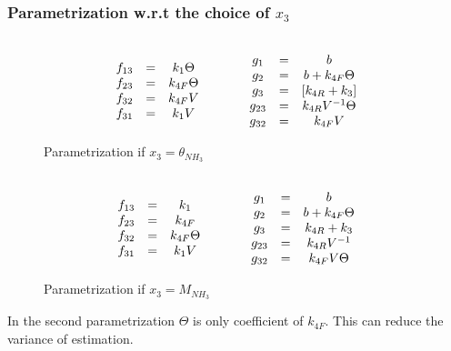 \subsubsection{Parametrization w.r.t the choice of $x_3$}

\begin{figure}[H]
 \begin{align*}
    \begin{matrix} 
    \\f_{13} &=& k_1 \Theta
    \\f_{23} &=& k_{4F} \Theta
    \\f_{32} &=& k_{4F} V
    \\f_{31} &=& k_1 V
     \end{matrix}
    \qquad \qquad
    \begin{matrix} 
    \\ g_1    &=& b
    \\ g_2    &=& b + k_{4F} \Theta
    \\ g_{3}  &=& [k_{4R}+k_3]
    \\ g_{23} &=& k_{4R} V^{-1} \Theta
    \\ g_{32} &=& k_{4F} V
     \end{matrix}
\end{align*}
 \caption*{Parametrization if $x_3 = \theta_{NH_3}$}
\end{figure}
\begin{figure}[H]
\begin{align*}
    \begin{matrix} 
    \\f_{13} &=& k_1
    \\f_{23} &=& k_{4F}
    \\f_{32} &=& k_{4F} \Theta
    \\f_{31} &=& k_1 V
     \end{matrix}
    \qquad \qquad
    \begin{matrix} 
    \\ g_1    &=& b
    \\ g_2    &=& b + k_{4F} \Theta
    \\ g_{3}  &=& k_{4R}+k_3
    \\ g_{23} &=& k_{4R} V^{-1}
    \\ g_{32} &=& k_{4F} V \Theta
     \end{matrix}
\end{align*}
\caption*{Parametrization if $x_3 = M_{NH_3}$}
\end{figure}

In the second parametrization $\Theta$ is only coefficient of $k_{4F}$. This can
reduce the variance of estimation.
